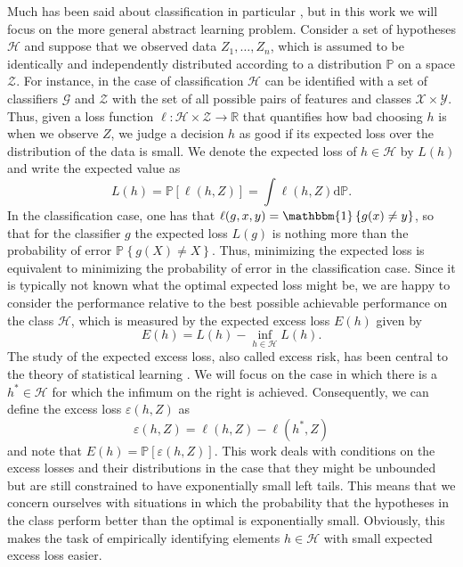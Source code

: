 \documentclass{uvamath}
\newcommand*{\reals}{\mathbb{R}}
\newcommand*{\calG}{\mathcal{G}}
\newcommand*{\calH}{\mathcal{H}}
\newcommand*{\calX}{\mathcal{X}}
\newcommand*{\calY}{\mathcal{Y}}
\newcommand*{\calZ}{\mathcal{Z}}
\newcommand*{\bbP}{\mathbb{P}}
\newcommand*{\prob}[2][]{\mathbb{P}_{#1}\left\{#2\right\}}
\newcommand*{\indicator}[1]{\mathbbm{1}\left\{#1\right\}}
\newcommand*{\rmd}{\mathrm{d}}
\theoremstyle{remark}
\theoremstyle{definition}
\theoremstyle{definition}
\theoremstyle{definition}
\theoremstyle{definition}
\theoremstyle{definition}
\begin{document}
Much has been said about classification in particular
\citep[see][]{gyorfi_probabilistic_1996, boucheron_theory_2005}, but
in this work we will focus on the more general abstract learning
problem. Consider a set of hypotheses $\calH$ and suppose that we
observed data $Z_1,\dots,Z_n$, which is assumed to be identically and
independently distributed according to a distribution $\bbP$ on a
space $\calZ$. For instance, in the case of classification $\calH$ can
be identified with a set of classifiers $\calG$ and $\calZ$ with the
set of all possible pairs of features and classes
$\calX\times\calY$. Thus, given a loss function
$\ell:\calH\times\calZ\to\reals$ that quantifies how bad choosing $h$
is when we observe $Z$, we judge a decision $h$ as good if its
expected loss over the distribution of the data is small. We denote
the expected loss of $h\in\calH$ by $L(h)$ and write the expected
value as
\begin{equation*}
  L(h) = \bbP[\ell(h,Z)] = \int \ell(h,Z) \rmd \bbP.
\end{equation*}
In the classification case, one has that
$\ell(g,x,y) = \indicator{g(x)\neq y}$, so that for the classifier $g$
the expected loss $L(g)$ is nothing more than the probability of error
$\prob{g(X)\neq X}$. Thus, minimizing the expected loss is equivalent
to minimizing the probability of error in the classification
case. Since it is typically not known what the optimal expected loss
might be, we are happy to consider the performance relative to the
best possible achievable performance on the class $\calH$, which is
measured by the expected excess loss $E(h)$ given by
\begin{equation*}
  E(h) = L(h) - \inf_{h\in\calH}L(h).
\end{equation*}
The study of the expected excess loss, also called excess risk, has
been central to the theory of statistical learning
\citep{vapnik_statistical_1998}. We will focus on the case in which
there is a $h^*\in\calH$ for which the infimum on the right is
achieved. Consequently, we can define the excess loss
$\varepsilon(h,Z)$ as
$$ \varepsilon(h,Z) = \ell(h,Z) - \ell(h^*,Z)$$ and note that $E(h) =
\bbP[\varepsilon(h,Z)]$.
This work deals with conditions on the excess losses and their
distributions in the case that they might be unbounded but are still
constrained to have exponentially small left tails. This means that we
concern ourselves with situations in which the probability that the
hypotheses in the class perform better than the optimal is
exponentially small. Obviously, this makes the task of empirically
identifying elements $h\in\calH$ with small expected excess loss
easier.
\end{document}
